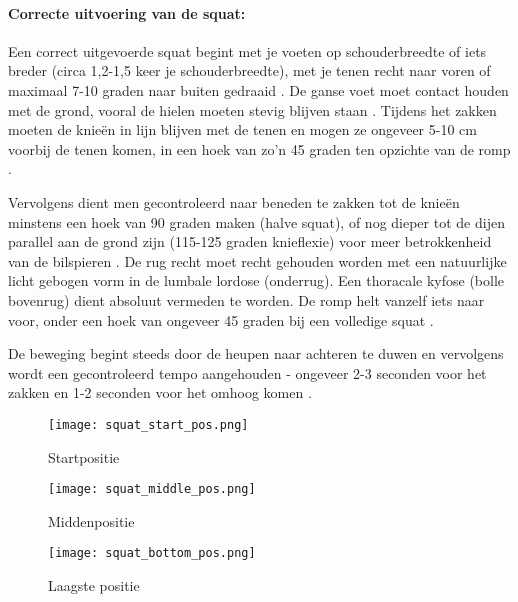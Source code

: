 \paragraph{Correcte uitvoering van de squat:}
Een correct uitgevoerde squat begint met je voeten op schouderbreedte of iets breder (circa 1,2-1,5 keer je schouderbreedte), met je tenen recht naar voren of maximaal 7-10 graden naar buiten gedraaid \autocite{LorenzettiEtAl2018}. 
De ganse voet moet contact houden met de grond, vooral de hielen moeten stevig blijven staan \autocite{CzaprowskiEtAl2012}. 
Tijdens het zakken moeten de knieën in lijn blijven met de tenen en mogen ze ongeveer 5-10 cm voorbij de tenen komen, in een hoek van zo'n 45 graden ten opzichte van de romp \autocite{LorenzettiEtAl2018}.

\medskip

Vervolgens dient men gecontroleerd naar beneden te zakken tot de knieën minstens een hoek van 90 graden maken (halve squat), of nog dieper tot de dijen parallel aan de grond zijn (115-125 graden knieflexie) voor meer betrokkenheid van de bilspieren \autocite{ComfortEtAl2018}. 
De rug recht moet recht gehouden worden met een natuurlijke licht gebogen vorm in de lumbale lordose (onderrug).
Een thoracale kyfose (bolle bovenrug) dient absoluut vermeden te worden.
De romp helt vanzelf iets naar voor, onder een hoek van ongeveer 45 graden bij een volledige squat \autocite{CzaprowskiEtAl2012}.

De beweging begint steeds door de heupen naar achteren te duwen en vervolgens wordt een gecontroleerd tempo aangehouden - ongeveer 2-3 seconden voor het zakken en 1-2 seconden voor het omhoog komen \autocite{CzaprowskiEtAl2012}.

\begin{figure}[h]
  \centering
  \begin{minipage}[t]{0.32\textwidth}
    \centering
    \texttt{[image: squat\_start\_pos.png]}
    \caption[Startpositie squat]{\label{fig:squat_startpositie} Startpositie \autocite{RonaiEtAl2023}}
  \end{minipage}
  \hfill
  \begin{minipage}[t]{0.32\textwidth}
    \centering
    \texttt{[image: squat\_middle\_pos.png]}
    \caption[Middenpositie squat]{\label{fig:squat_middenpositie} Middenpositie \autocite{RonaiEtAl2023}}
  \end{minipage}
  \hfill
  \begin{minipage}[t]{0.32\textwidth}
    \centering
    \texttt{[image: squat\_bottom\_pos.png]}
    \caption[Onderste positie squat]{\label{fig:squat_onderpositie} Laagste positie \autocite{RonaiEtAl2023}}
  \end{minipage}
\end{figure}


